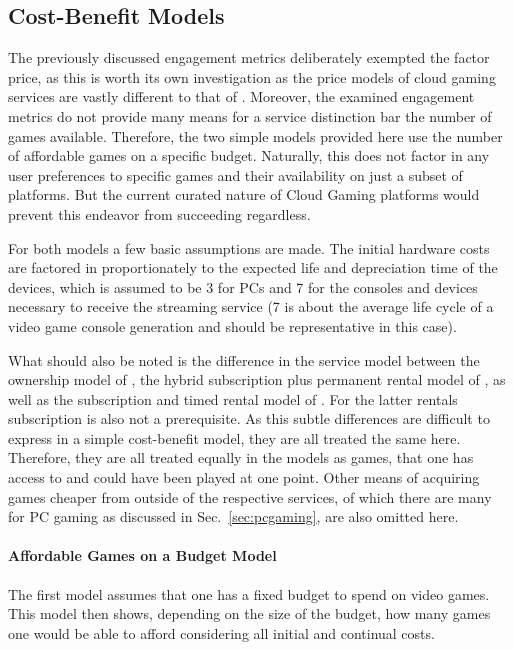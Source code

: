 \subsection{Cost-Benefit Models}

The previously discussed engagement metrics deliberately exempted the factor price, as this is worth its own investigation as the price models of cloud gaming services are vastly different to that of \steam. Moreover, the examined engagement metrics do not provide many means for a service distinction bar the number of games available. Therefore, the two simple models provided here use the number of affordable games on a specific budget. Naturally, this does not factor in any user preferences to specific games and their availability on just a subset of platforms. But the current curated nature of Cloud Gaming platforms would prevent this endeavor from succeeding regardless.

For both models a few basic assumptions are made. The initial hardware costs are factored in proportionately to the expected life and depreciation time of the devices, which is assumed to be \SI{3}{\year} for PCs and \SI{7}{\year} for the consoles and devices necessary to receive the streaming service (\SI{7}{\year} is about the average life cycle of a video game console generation and should be representative in this case).

What should also be noted is the difference in the service model between the ownership model of \steam, the hybrid subscription plus permanent rental model of \gfnow, as well as the subscription and timed rental model of \psnow. For the latter rentals subscription is also not a prerequisite. As this subtle differences are difficult to express in a simple cost-benefit model, they are all treated the same here. Therefore, they are all treated equally in the models as games, that one has access to and could have been played at one point. Other means of acquiring games cheaper from outside of the respective services, of which there are many for PC gaming as discussed in Sec.~\ref{sec:pcgaming}, are also omitted here.

\paragraph{Affordable Games on a Budget Model}

The first model assumes that one has a fixed budget to spend on video games. This model then shows, depending on the size of the budget, how many games one would be able to afford considering all initial and continual costs.

